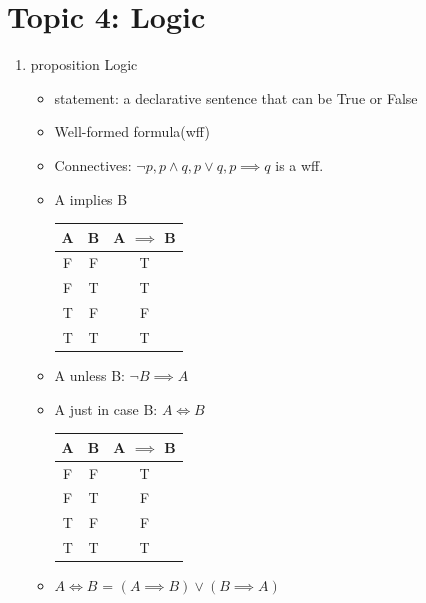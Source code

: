 \documentclass[11pt, a4paper]{article}
\begin{document}
\section*{Topic 4: Logic}
    \begin{enumerate}
        \item proposition Logic
            \begin{itemize}
                \item statement: a declarative sentence that can be True or False
                \item Well-formed formula(wff)
                \item Connectives: $\lnot p, p \land q, p \lor q, p\implies q$ is a wff.
                \item A implies B
                    \begin{tabular}{|c|c|c|}
                        \hline
                        A & B & A $\implies$ B\\
                        \hline
                        F & F & T\\
                        \hline
                        F & T & T\\
                        \hline
                        T & F & F\\
                        \hline
                        T & T & T\\
                        \hline
                    \end{tabular}
                \item A unless B: $\lnot B \implies A$
                \item A just in case B: $A \iff B$
                    \begin{tabular}{|c|c|c|}
                        \hline
                        A & B & A $\implies$ B\\
                        \hline
                        F & F & T\\
                        \hline
                        F & T & F\\
                        \hline
                        T & F & F\\
                        \hline
                        T & T & T\\
                        \hline
                    \end{tabular}
                \item $A \iff B$ = $(A \implies B) \lor (B \implies A)$
            \end{itemize}

\end{enumerate}
\end{document}
